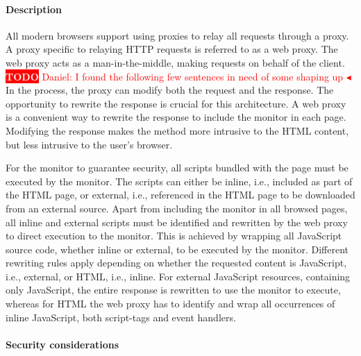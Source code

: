 \documentclass{llncs}
\newcommand{\todo}[1]{\colorbox{red}{\textcolor{white}{\sffamily\bfseries\scriptsize TODO}} \textcolor{red}{#1} \textcolor{red}{$\blacktriangleleft$}}
\begin{document}
\paragraph{Description}
All modern browsers support using proxies to relay all requests through a proxy.
A proxy specific to relaying HTTP requests is referred to as a web proxy.
The web proxy acts as a man-in-the-middle, making 
requests on behalf of the client. 
\todo{Daniel: I found the following few sentences in need of some shaping up}
In the process, the proxy can
modify both the request and the response. 
The opportunity to rewrite the response is crucial for this architecture.
A web proxy is a convenient way to rewrite the response to include 
the monitor in each page. Modifying the response makes the method more 
intrusive to the HTML content, but less intrusive to the user's browser. 

For the monitor to guarantee security, all scripts bundled with 
the page must be executed by the monitor. The scripts can either be inline, 
i.e., included as part of the HTML page, or external, i.e., referenced in the 
HTML page to be downloaded from an external source.
Apart from including the monitor in all browsed pages, all inline and external 
scripts must be identified and rewritten by the web proxy to direct execution to the monitor.
This is achieved by wrapping all JavaScript source code, whether inline or 
external, to be executed by the monitor.
Different rewriting rules apply depending on whether the 
requested content is JavaScript, i.e., external, or HTML, i.e., inline. 
For external 
JavaScript resources, containing only JavaScript, the entire response is rewritten to use the monitor to execute, whereas 
for HTML the web proxy has to identify and wrap all occurrences of inline 
JavaScript, both script-tags and event handlers.


\paragraph{Security considerations}
\end{document}
